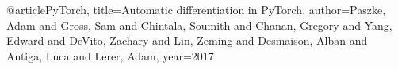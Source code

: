 @article{PyTorch,
  title={Automatic differentiation in PyTorch},
  author={Paszke, Adam and Gross, Sam and Chintala, Soumith and Chanan, Gregory and Yang, Edward and DeVito, Zachary and Lin, Zeming and Desmaison, Alban and Antiga, Luca and Lerer, Adam},
  year={2017}
}